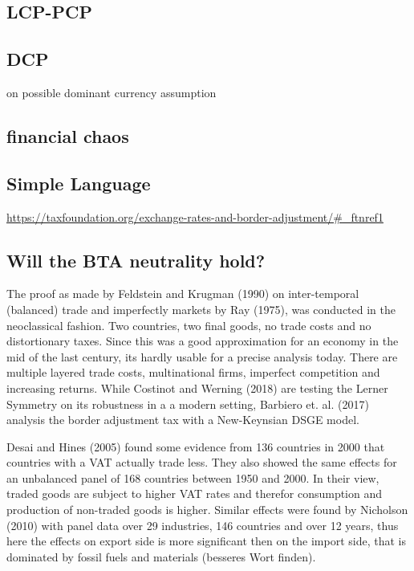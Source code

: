 \subsection{LCP-PCP}
\subsection{DCP}
\cite{casas2017dominant} on possible dominant currency assumption

\subsection{financial chaos}
\subsection{Simple Language}
\url{https://taxfoundation.org/exchange-rates-and-border-adjustment/#_ftnref1}

\subsection{Will the BTA neutrality hold?}
The proof as made by Feldstein and Krugman (1990) on inter-temporal (balanced) trade and imperfectly markets by Ray (1975), was conducted in the neoclassical fashion. Two countries, two final goods, no trade costs and no distortionary taxes. Since this was a good approximation for an economy in the mid of the last century, its hardly usable for a precise analysis today. There are multiple layered trade costs, multinational firms, imperfect competition and increasing returns. While Costinot and Werning (2018) are testing the Lerner Symmetry on its robustness in a a modern setting, Barbiero et. al. (2017) analysis the border adjustment tax with a New-Keynsian DSGE model. 

Desai and Hines (2005) found some evidence from 136 countries in 2000 that countries with a VAT actually trade less. They also showed the same effects for an unbalanced panel of 168 countries between 1950 and 2000. In their view, traded goods are subject to higher VAT rates and therefor consumption and production of non-traded goods is higher. Similar effects were found by Nicholson (2010) with panel data over 29 industries, 146 countries and over 12 years, thus here the effects on export side is more significant then on the import side, that is dominated by fossil fuels and materials (besseres Wort finden). 

